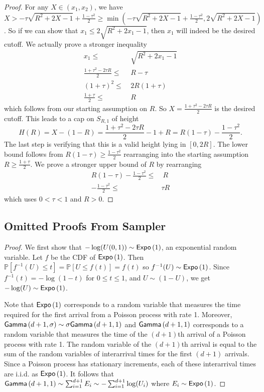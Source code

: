 {\begin{proof}
    For any $X \in (x_1, x_2)$, we have $X > -\tau\sqrt{R^2+2X-1} + \frac{1-\tau^2}{2} \geq \min(-\tau\sqrt{R^2+2X-1} + \frac{1-\tau^2}{2}, 2\sqrt{R^2+2X-1})$. So if we can show that $x_1 \leq 2\sqrt{R^2+2x_{1}-1}$, then $x_1$ will indeed be the desired cutoff. We actually prove a stronger inequality
    \begin{align*}
        x_1 \leq&\ \sqrt{R^2+2x_{1}-1} \\
        \frac{1+\tau^2 - 2\tau R}{2} \leq&\ R - \tau \\
        (1+\tau)^2 \leq&\ 2R(1 + \tau) \\
        \frac{1+\tau}{2} \leq&\ R
    \end{align*}
    which follows from our starting assumption on $R$. So $X = \frac{1+\tau^2 -2\tau R}{2}$ is the desired cutoff. This leads to a cap on $S_{R,1}$ of height
    \begin{equation*}
        H(R) = X-(1-R) = \frac{1+\tau^2 -2\tau R}{2} - 1 + R = R(1-\tau) - \frac{1-\tau^2}{2}.
    \end{equation*}
    The last step is verifying that this is a valid height lying in $[0,2R]$. The lower bound follows from $R(1-\tau) \geq \frac{1-\tau^2}{2}$ rearranging into the starting assumption $R \geq \frac{1+\tau}{2}$. We prove a stronger upper bound of $R$ by rearranging
    \begin{align*}
        R(1-\tau) - \frac{1-\tau^2}{2} \leq&\ R \\
        -\frac{1-\tau^2}{2} \leq& \tau R
    \end{align*}
    which uses $0 < \tau <1$ and $R > 0$.
\end{proof}}

\subsection{Omitted Proofs From Sampler}
\label{subsec:appendix_sampler}
\gammaSample*
\begin{proof}
    We first show that $-\log(U(0,1)) \sim \mathsf{Expo}\left(1\right)$, an exponential random variable. Let $f$ be the CDF of $\mathsf{Expo}\left(1\right)$. Then $\mathbb{P}[f^{-1}(U) \leq t] = \mathbb{P}[U \leq f(t)] = f(t)$ so $f^{-1}(U) \sim \mathsf{Expo}\left(1\right)$. Since $f^{-1}(t) = -\log(1-t)$ for $0 \leq t \leq 1$, and $U \sim (1 - U)$, we get $-\log(U) \sim \mathsf{Expo}\left(1\right)$. 

    Note that $\mathsf{Expo}\left(1\right)$ corresponds to a random variable that measures the time required for the first arrival from a Poisson process with rate 1. Moreover, $\mathsf{Gamma}\left(d+1, \sigma\right) \sim \sigma\mathsf{Gamma}\left(d+1, 1\right)$ and $\mathsf{Gamma}\left(d+1, 1\right)$ corresponds to a random variable that measures the time of the $(d+1)$th arrival of a Poisson process with rate 1. The random variable of the $(d+1)$th arrival is equal to the sum of the random variables of interarrival times for the first $(d+1)$ arrivals. Since a Poisson process has stationary increments, each of these interarrival times are i.i.d. as $\mathsf{Expo}\left(1\right)$. It follows that $\mathsf{Gamma}\left(d+1, 1\right) \sim \sum_{i=1}^{d+1}E_{i} \sim -\sum_{i=1}^{d+1}\log(U_i)$ where $E_{i} \sim \mathsf{Expo}\left(1\right)$.
\end{proof}

